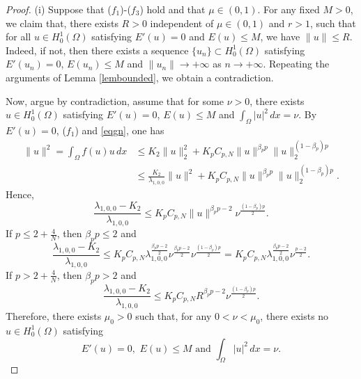 \documentclass[11pt]{amsart}
\newcommand{\norm}[1]{\lVert#1\rVert}
\numberwithin{equation}{section}
\begin{document}
\begin{proof}
    (i) Suppose that ($f_1$)-($f_3$) hold and that $\mu \in (0,1)$. For any fixed $M>0$, we claim that, there exists $R>0$ independent of $\mu \in (0,1)$ and $r>1$, such that for all  $u \in H_0^1(\Omega)$ satisfying $E'(u) = 0$ and $E(u)\leq M$, we have $\norm{u}\leq R$. Indeed, if not, then there exists a sequence $\{u_n\}\subset H_0^1(\Omega)$ satisfying $E'(u_n) = 0$, $E(u_n)\leq M$
    and $\norm{u_n} \to +\infty$ as $n \to +\infty$. Repeating the arguments of Lemma \ref{lembounded}, we obtain a contradiction.

    Now, argue by contradiction, assume that for some $\nu>0$, there exists $u \in H_0^1(\Omega)$ satisfying $E'(u) = 0$, $E(u)\leq M$ and $\int_{\Omega}|u|^2\,dx=\nu$. By $E'(u) = 0$, ($f_1$) and \eqref{eqgn}, one has
    \begin{equation*}\label{lemnonex}
        \begin{aligned}
        \norm{u}^2 = \int_\Omega f(u)u\,dx &\leq K_2 \norm{u}_2^2+K_{p} C_{p,N}\norm{u}^{\beta_{p}{p}}\norm{u}_2^{(1-\beta_{p}){p}} \\
        &\leq \frac{K_2}{\lambda_{1,0,0}} \norm{u}^2+K_{p} C_{p,N}\norm{u}^{\beta_{p}{p}}\norm{u}_2^{(1-\beta_{p}){p}}.
        \end{aligned}
    \end{equation*}
    Hence,
    \begin{equation*}
    \frac{\lambda_{1,0,0}-K_2}{\lambda_{1,0,0}}\leq K_{p} C_{p,N}\norm{u}^{\beta_{p}{p}-2}\nu^\frac{(1-\beta_{p}){p}}{2}.
    \end{equation*}
    If $p \leq 2+\frac{4}{N}$, then $\beta_pp\leq 2$ and
    $$
    \frac{\lambda_{1,0,0}-K_2}{\lambda_{1,0,0}}\leq K_{p} C_{p,N}\lambda_{1,0,0}^\frac{{\beta_{p}{p}-2}}{2}\nu^\frac{{\beta_{p}{p}-2}}{2} \nu^\frac{(1-\beta_{p}){p}}{2}=K_{p} C_{p,N} \lambda_{1,0,0}^\frac{{\beta_{p}{p}-2}}{2}\nu^\frac{p-2}{2}.
    $$
     If $p > 2+\frac{4}{N}$, then $\beta_pp > 2$ and
    $$
    \frac{\lambda_{1,0,0}-K_2}{\lambda_{1,0,0}}\leq K_{p} C_{p,N}R^{\beta_{p}{p}-2} \nu^\frac{(1-\beta_{p}){p}}{2}.
    $$
    Therefore, there exists $\mu_0>0$ such that, for any $0<\nu<\mu_0$, there exists no $u \in H_0^1(\Omega)$ satisfying
     $$
     E'(u) = 0,\,\,E(u)\leq M\,\,\text{and}\,\,\int_{\Omega}|u|^2 \,dx=\nu.
     $$



\end{proof}
\end{document}
